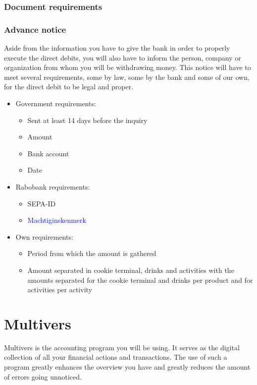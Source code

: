 \documentclass{report}
\begin{document}
\subsubsection{Document requirements}

\subsubsection{Advance notice}
Aside from the information you have to give the bank in order to properly execute the direct debits, you will also have to inform the person, company or organization from whom you will be withdrawing money. This notice will have to meet several requirements, some by law, some by the bank and some of our own, for the direct debit to be legal and proper.
\begin{itemize}
	\item Government requirements:
	\begin{itemize}
		\item Sent at least 14 days before the inquiry 
		\item Amount
		\item Bank account
		\item Date
	\end{itemize}
	\item Rabobank requirements:
	\begin{itemize}
		\item SEPA-ID
		\item \textcolor{blue}{Machtiginskenmerk}
	\end{itemize}
	\item Own requirements:
	\begin{itemize}
		\item Period from which the amount is gathered
		\item Amount separated in cookie terminal, drinks and activities with the amounts separated for the cookie terminal and drinks per product and for activities per activity
	\end{itemize}
\end{itemize}
     
\section{Multivers}
Multivers is the accounting program you will be using. It serves as the digital collection of all your financial actions and transactions. The use of such a program greatly enhances the overview you have and greatly reduces the amount of errors going unnoticed.
\end{document}
